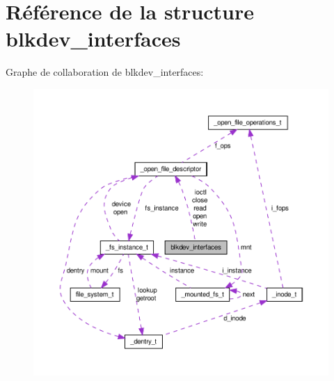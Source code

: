 \hypertarget{structblkdev__interfaces}{\section{\-Référence de la structure blkdev\-\_\-interfaces}
\label{structblkdev__interfaces}
}


\-Graphe de collaboration de blkdev\-\_\-interfaces\-:\nopagebreak
\begin{figure}[H]
\begin{center}
\leavevmode
\includegraphics[width=350pt]{structblkdev__interfaces__coll__graph}
\end{center}
\end{figure}
